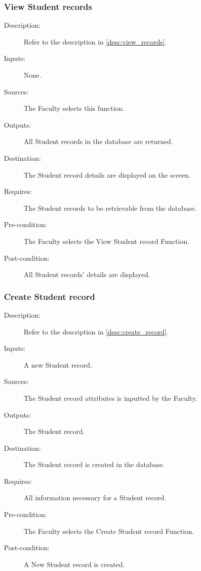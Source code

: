 \subsubsection{\large View Student records} 
\begin{boxed} %
\begin{description}
\item[Description:]
   Refer to the description in \autoref{desc:view_records}.
\item[Inputs:]
   None.
\item[Sources:]
   The Faculty selects this function.
\item[Outputs:]
   All Student records in the database are returned.
\item[Destination:]
   The Student record details are displayed on the screen.
\item[Requires:]
   The Student records to be retrievable from the database.
\item[Pre-condition:]
   The Faculty selects the View Student record Function.
\item[Post-condition:]
   All Student records' details are displayed.
\end{description}
\end{boxed} %

\subsubsection{\large Create Student record} 
\begin{boxed} %
\begin{description}
\item[Description:]
   Refer to the description in \autoref{desc:create_record}.
\item[Inputs:]
   A new Student record.
\item[Sources:]
   The Student record attributes is inputted by the Faculty.
\item[Outputs:]
   The Student record.
\item[Destination:]
   The Student record is created in the database.
\item[Requires:]
   All information necessary for a Student record.
\item[Pre-condition:]
   The Faculty selects the Create Student record Function.
\item[Post-condition:]
   A New Student record is created.
\end{description}
\end{boxed} %

